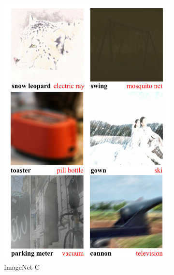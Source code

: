 \documentclass[10pt]{article}
\begin{document}
\begin{figure}[!htb]
\begin{subfigure}{.33\textwidth}
		\includegraphics[width=\linewidth]{fig/imagenet_c}
		\caption{ImageNet-C}
		\label{fig:imagenet_c}
	\end{subfigure}\hfill
	\begin{subfigure}{.33\textwidth}

\end{subfigure}
\end{figure}
\end{document}
